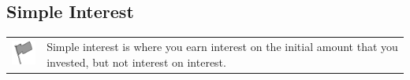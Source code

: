     \label{m39332*cid5}
            \subsection{ Simple Interest}
            \nopagebreak
            
      
\par
            \label{m39332*fhsst!!!underscore!!!id906}\begin{definition}
	  \begin{tabular*}{15 cm}{m{15 mm}m{}}
	\hspace*{-50pt}  \includegraphics[width=0.5in]{col11306.imgs/psflag2.png}   & \Definition{   \label{id2476740}\textbf{ Simple Interest }} { \label{m39332*meaningfhsst!!!underscore!!!id906}
      \label{m39332*id69230}Simple interest is where you earn interest on the initial amount that you invested, but not interest on interest. \par 
       } 
      \end{tabular*}
      \end{definition}

